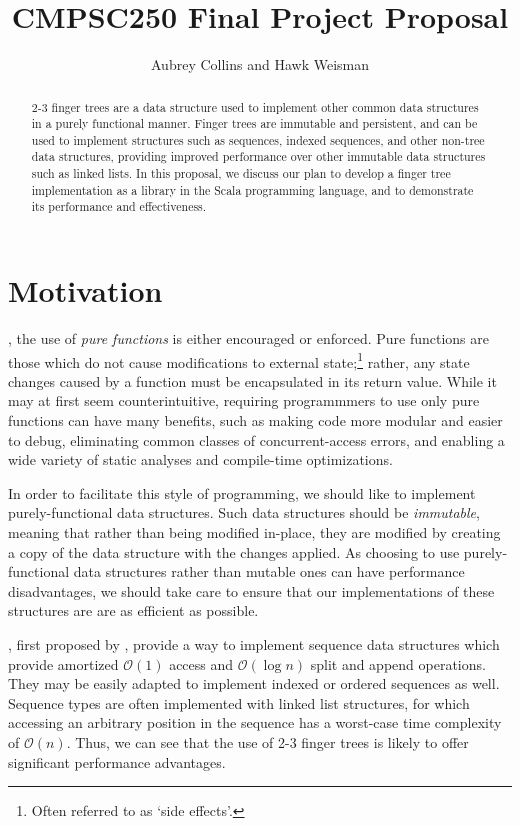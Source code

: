\documentclass[a4paper,nobib]{tufte-handout}
\title{CMPSC250 Final Project Proposal}
\author{Aubrey Collins and Hawk Weisman}
\begin{document}
\maketitle
\begin{abstract}
2-3 finger trees are a data structure used to implement other common data structures in a purely functional manner.\cite{Hinze:2006:FTS:1114670.1114674} Finger trees are immutable and persistent, and can be used to implement structures such as sequences, indexed sequences, and other non-tree data structures, providing improved performance over other immutable data structures such as linked lists. In this proposal, we discuss our plan to develop a finger tree implementation as a library in the Scala programming language, and to demonstrate its performance and effectiveness.
\end{abstract}

\section{Motivation}
, the use of \textit{pure functions} is either encouraged or enforced. Pure functions are those which do not cause modifications to external state;\footnote{Often referred to as `side effects'.} rather, any state changes caused by a function must be encapsulated in its return value.\cite{JFP:44143} While it may at first seem counterintuitive, requiring programmmers to use only pure functions can have many benefits, such as making code more modular and easier to debug, eliminating common classes of concurrent-access errors, and enabling a wide variety of static analyses and compile-time optimizations.

In order to facilitate this style of programming, we should like to implement purely-functional data structures. Such data structures should be \textit{immutable}, meaning that rather than being modified in-place, they are modified by creating a copy of the data structure with the changes applied.\cite{okasaki1999purely} As choosing to use purely-functional data structures rather than mutable ones can have performance disadvantages, we should take care to ensure that our implementations of these structures are are as efficient as possible.

, first proposed by \citeauthor{Hinze:2006:FTS:1114670.1114674}, provide a way to implement sequence data structures which provide amortized $\mathcal{O}(1)$ access and $\mathcal{O}(\log n)$ split and append operations. They may be easily adapted to implement indexed or ordered sequences as well.\cite[-1in]{Hinze:2006:FTS:1114670.1114674} Sequence types are often implemented with linked list structures, for which accessing an arbitrary position in the sequence has a worst-case time complexity of $\mathcal{O}(n)$. Thus, we can see that the use of 2-3 finger trees is likely to offer significant performance advantages.
\end{document}
